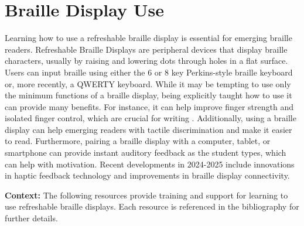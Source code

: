 \hypertarget{appx10}{}\section[Braille Display Use]{Braille Display Use}\label{appx10}
Learning how to use a refreshable braille display is essential for emerging braille readers. Refreshable Braille Displays are peripheral devices that display braille characters, usually by raising and lowering dots through holes in a flat surface. Users can input braille using either the 6 or 8 key Perkins-style braille keyboard or, more recently, a QWERTY keyboard. While it may be tempting to use only the minimum functions of a braille display, being explicitly taught how to use it can provide many benefits. For instance, it can help improve finger strength and isolated finger control, which are crucial for writing \cite{PerkinsBrailleDisplay}. Additionally, using a braille display can help emerging readers with tactile discrimination and make it easier to read. Furthermore, pairing a braille display with a computer, tablet, or smartphone can provide instant auditory feedback as the student types, which can help with motivation. Recent developments in 2024-2025 include innovations in haptic feedback technology and improvements in braille display connectivity.

\noindent
\textbf{Context:} The following resources provide training and support for learning to use refreshable braille displays. Each resource is referenced in the bibliography for further details.

